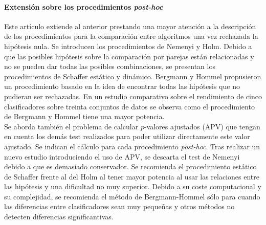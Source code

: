 \paragraph{Extensión sobre los procedimientos 
\textit{post-hoc}} \cite{garcia2008extension} Este artículo 
extiende al anterior prestando una mayor atención a la 
descripción de los procedimientos para la comparación entre 
algoritmos una vez rechazada la hipótesis nula. Se introducen
los procedimientos de Nemenyi y Holm. Debido a que las 
posibles hipótesis sobre la comparación  por parejas están 
relacionadas y no se pueden dar todas las posibles 
combinaciones, se presentan los procedimientos de 
Schaffer estático y dinámico. Bergmann y Hommel propusieron 
un procedimiento basado en la idea de encontrar todas las 
hipótesis que no pudieran ser rechazadas. En un estudio 
comparativo sobre el rendimiento de cinco clasificadores 
sobre treinta conjuntos de datos se observa como el 
procedimiento de Bergmann y Hommel tiene una mayor 
potencia.\\

	Se aborda también el problema de calcular $p$-valores 
ajustados (APV) que tengan en cuenta los demás test 
realizados para poder utilizar directamente este valor 
ajustado. Se indican el cálculo para cada procedimiento 
\textit{post-hoc}. Tras realizar un nuevo estudio 
introduciendo el uso de APV, se descarta el test de Nemenyi 
debido a que es demasiado conservador. Se recomienda el 
procedimiento estático de Schaffer frente al del Holm al 
tener mayor potencia al usar las relaciones entre las 
hipótesis y una dificultad no muy superior. Debido a su coste 
computacional y su complejidad, se recomienda el método de 
Bergmann-Hommel sólo para cuando las diferencias entre 
clasificadores sean muy pequeñas y otros métodos no detecten 
diferencias significantivas.

